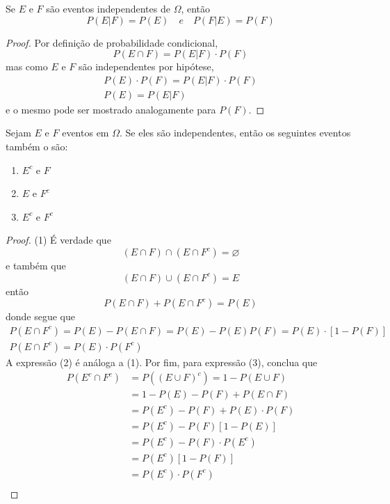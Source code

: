 \begin{prop:independencia}
Se $E$ e $F$ são eventos independentes de $\Omega$, então
\[
	P(E | F) = P(E) \quad \mathit{ e }\quad P(F | E) = P(F)
\]
\begin{proof}
	Por definição de probabilidade condicional,
	\[
		P(E \cap F) = P(E|F) \cdot P(F)
	\]
	mas como $E$ e $F$ são independentes por hipótese,
	\begin{gather*}
		P(E) \cdot P(F) = P(E|F) \cdot P(F)\\
		P(E) = P(E|F)
	\end{gather*}
	e o mesmo pode ser mostrado analogamente para $P(F)$.
\end{proof}
\end{prop:independencia}

\begin{prop:independencia complementar}
\label{prop:independencia complementar}
Sejam $E$ e $F$ eventos em $\Omega$. Se eles são independentes, então os seguintes
eventos também o são:
\begin{enumerate}
	\item $E^c$ e $F$
	\item $E$ e $F^c$
	\item $E^c$ e $F^c$
\end{enumerate}
\begin{proof}
	(1) É verdade que
	\[
		(E \cap F) \cap (E \cap F^c) = \varnothing
	\]
	e também que
	\[
		(E \cap F) \cup (E \cap F^c) =  E
	\]
	então
	\[
		P(E \cap F) + P(E \cap F^c) = P(E)
	\]
	donde segue que
	\begin{gather*}
		P(E \cap F^c) = P(E) - P(E \cap F) = P(E) - P(E)P(F) = P(E) \cdot [1 - P(F)] \\
		P(E \cap F^c) = P(E) \cdot P(F^c)
	\end{gather*}
	A expressão (2) é análoga a (1). Por fim, para expressão (3), conclua que
	\begin{align*}
		P(E^c \cap F^c) & = P((E \cup F)^c) = 1 - P(E \cup F) \\
		                & = 1 - P(E) - P(F) + P(E \cap F)     \\
		                & = P(E^c) - P(F) + P(E) \cdot P(F)   \\
		                & = P(E^c) - P(F) [1 - P(E)]          \\
		                & = P(E^c) - P(F) \cdot P(E^c)        \\
		                & = P(E^c) [1 - P(F)]                 \\
		                & = P(E^c) \cdot P(F^c)               \\
	\end{align*}
\end{proof}
\end{prop:independencia complementar}

